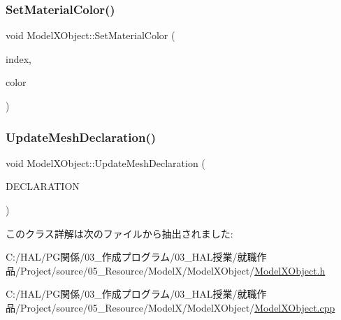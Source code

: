 \subsubsection{\texorpdfstring{Set\+Material\+Color()}{SetMaterialColor()}}
{\footnotesize\ttfamily void Model\+X\+Object\+::\+Set\+Material\+Color (\begin{DoxyParamCaption}\item[{unsigned}]{index,  }\item[{\mbox{\hyperlink{_vector3_d_8h_a680c30c4a07d86fe763c7e01169cd6cc}{X\+Color4}}}]{color }\end{DoxyParamCaption})}

\mbox{\label{class_model_x_object_ac005f3f164a1f75d6cfc0772e2e95382}} 
\subsubsection{\texorpdfstring{Update\+Mesh\+Declaration()}{UpdateMeshDeclaration()}}
{\footnotesize\ttfamily void Model\+X\+Object\+::\+Update\+Mesh\+Declaration (\begin{DoxyParamCaption}\item[{const D3\+D\+V\+E\+R\+T\+E\+X\+E\+L\+E\+M\+E\+N\+T9 $\ast$}]{D\+E\+C\+L\+A\+R\+A\+T\+I\+ON }\end{DoxyParamCaption})}



このクラス詳解は次のファイルから抽出されました\+:\begin{DoxyCompactItemize}
\item 
C\+:/\+H\+A\+L/\+P\+G関係/03\+\_\+作成プログラム/03\+\_\+\+H\+A\+L授業/就職作品/\+Project/source/05\+\_\+\+Resource/\+Model\+X/\+Model\+X\+Object/\mbox{\hyperlink{_model_x_object_8h}{Model\+X\+Object.\+h}}\item 
C\+:/\+H\+A\+L/\+P\+G関係/03\+\_\+作成プログラム/03\+\_\+\+H\+A\+L授業/就職作品/\+Project/source/05\+\_\+\+Resource/\+Model\+X/\+Model\+X\+Object/\mbox{\hyperlink{_model_x_object_8cpp}{Model\+X\+Object.\+cpp}}\end{DoxyCompactItemize}
